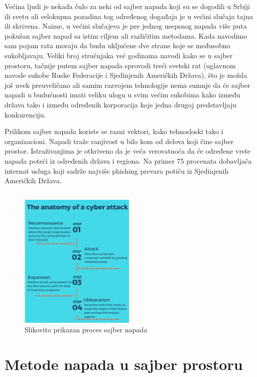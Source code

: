 \documentclass[a4paper]{article}
\begin{document}
{Većina ljudi je nekada čulo za neki od sajber napada koji su se dogodili u Srbiji ili svetu ali celokupna pozadina tog određenog događaja je u većini slučaja tajna ili skrivena. Naime, u većini slučajeva je pre jednog usepsnog napada više puta pokušan sajber napad sa istim ciljem ali različitim metodama. Kada navodimo sam pojam rata moraju da budu uključene dve strane koje se međusobno sukobljavaju. Veliki broj stručnjaka već godinama navodi kako se u sajber prostoru, tačnije putem sajber napada sprovodi treći svetski rat (uglavnom navode sukobe Ruske Federacije i Sjedinjenih Američkih Država), što je možda još uvek preuveličano ali samim razvojem tehnologije nema sumnje da će sajber napadi u budućnosti imati veliku ulogu u svim većim sukobima kako između država tako i između određenih korporacija koje jedna drugoj predstavljaju konkurenciju.

Prilikom sajber napada koriste se razni vektori, kako tehnosloski tako i organizacioni. Napadi traže ranjivost u bilo kom od delova koji čine sajber prostor. Istraživanjima je otkriveno da je veća verovatnoća da će određene vrste napada poteći iz određenih država i regiona. Na primer 75 procenata dobavljača internat usluga koji sadrže najviše phishing prevara potiču iz Sjedinjenih Američkih Država.


\begin{verbatim}
\end{verbatim}

\begin{figure}[h!]
  \centering
  \begin{center}
  \includegraphics[width=55mm]{index.jpeg}
  \end{center}
  \caption{Slikovito prikazan proces sajber napada}
  \label{fig:vr1}
\end{figure}

\newpage

\section{Metode napada u sajber prostoru}
\label{sec:naslov2}

}
\end{document}
